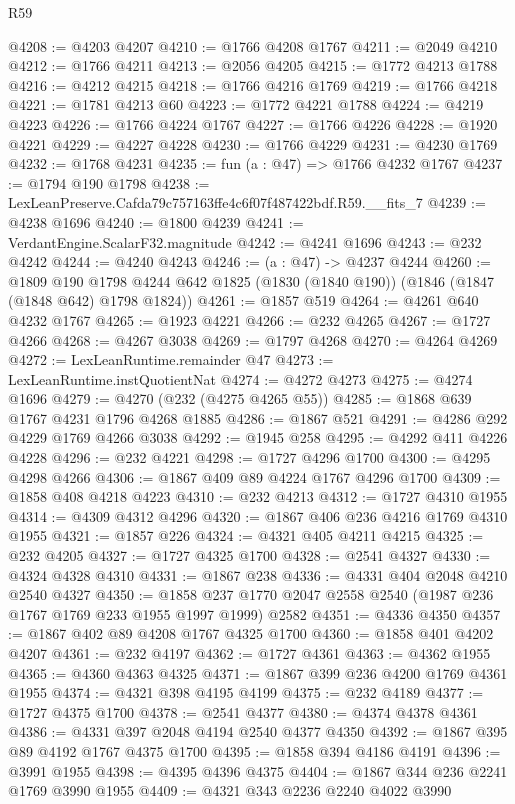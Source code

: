 \begin{lexlean}{R59}
\begin{coremodule}
@4208 := @4203 @4207
@4210 := @1766 @4208 @1767
@4211 := @2049 @4210
@4212 := @1766 @4211
@4213 := @2056 @4205
@4215 := @1772 @4213 @1788
@4216 := @4212 @4215
@4218 := @1766 @4216 @1769
@4219 := @1766 @4218
@4221 := @1781 @4213 @60
@4223 := @1772 @4221 @1788
@4224 := @4219 @4223
@4226 := @1766 @4224 @1767
@4227 := @1766 @4226
@4228 := @1920 @4221
@4229 := @4227 @4228
@4230 := @1766 @4229
@4231 := @4230 @1769
@4232 := @1768 @4231
@4235 := fun (a : @47) => @1766 @4232 @1767
@4237 := @1794 @190 @1798
@4238 := LexLeanPreserve.Cafda79c757163ffe4c6f07f487422bdf.R59.__fits_7
@4239 := @4238 @1696
@4240 := @1800 @4239
@4241 := VerdantEngine.ScalarF32.magnitude
@4242 := @4241 @1696
@4243 := @232 @4242
@4244 := @4240 @4243
@4246 := (a : @47) -> @4237 @4244
@4260 := @1809
    @190
    @1798
    @4244
    @642
    @1825
    (@1830 (@1840 @190))
    (@1846 (@1847 (@1848 @642) @1798 @1824))
@4261 := @1857 @519
@4264 := @4261 @640 @4232 @1767
@4265 := @1923 @4221
@4266 := @232 @4265
@4267 := @1727 @4266
@4268 := @4267 @3038
@4269 := @1797 @4268
@4270 := @4264 @4269
@4272 := LexLeanRuntime.remainder @47
@4273 := LexLeanRuntime.instQuotientNat
@4274 := @4272 @4273
@4275 := @4274 @1696
@4279 := @4270 (@232 (@4275 @4265 @55))
@4285 := @1868 @639 @1767 @4231 @1796 @4268 @1885
@4286 := @1867 @521
@4291 := @4286 @292 @4229 @1769 @4266 @3038
@4292 := @1945 @258
@4295 := @4292 @411 @4226 @4228
@4296 := @232 @4221
@4298 := @1727 @4296 @1700
@4300 := @4295 @4298 @4266
@4306 := @1867 @409 @89 @4224 @1767 @4296 @1700
@4309 := @1858 @408 @4218 @4223
@4310 := @232 @4213
@4312 := @1727 @4310 @1955
@4314 := @4309 @4312 @4296
@4320 := @1867 @406 @236 @4216 @1769 @4310 @1955
@4321 := @1857 @226
@4324 := @4321 @405 @4211 @4215
@4325 := @232 @4205
@4327 := @1727 @4325 @1700
@4328 := @2541 @4327
@4330 := @4324 @4328 @4310
@4331 := @1867 @238
@4336 := @4331 @404 @2048 @4210 @2540 @4327
@4350 := @1858 @237 @1770 @2047 @2558 @2540 (@1987 @236 @1767 @1769 @233 @1955 @1997 @1999) @2582
@4351 := @4336 @4350
@4357 := @1867 @402 @89 @4208 @1767 @4325 @1700
@4360 := @1858 @401 @4202 @4207
@4361 := @232 @4197
@4362 := @1727 @4361
@4363 := @4362 @1955
@4365 := @4360 @4363 @4325
@4371 := @1867 @399 @236 @4200 @1769 @4361 @1955
@4374 := @4321 @398 @4195 @4199
@4375 := @232 @4189
@4377 := @1727 @4375 @1700
@4378 := @2541 @4377
@4380 := @4374 @4378 @4361
@4386 := @4331 @397 @2048 @4194 @2540 @4377 @4350
@4392 := @1867 @395 @89 @4192 @1767 @4375 @1700
@4395 := @1858 @394 @4186 @4191
@4396 := @3991 @1955
@4398 := @4395 @4396 @4375
@4404 := @1867 @344 @236 @2241 @1769 @3990 @1955
@4409 := @4321 @343 @2236 @2240 @4022 @3990

\end{coremodule}
\end{lexlean}
